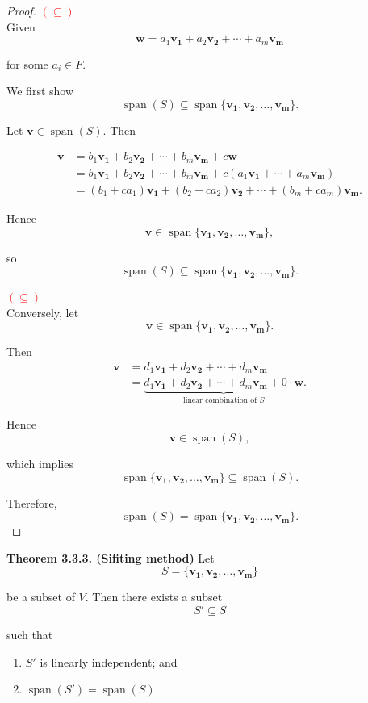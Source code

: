 \documentclass[12pt]{article}
\begin{document}
\begin{proof}
\textcolor{red}{$(\subseteq)$}\\
Given
\[
\mathbf{w}=a_1\mathbf{v_1}+a_2\mathbf{v_2}+\cdots+a_m\mathbf{v_m}
\]

for some $a_i\in F$.

We first show
\[
\operatorname{span}(S)\subseteq\operatorname{span}\{\mathbf{v_1,v_2,\ldots,v_m}\}.
\]

Let $\mathbf{v}\in\operatorname{span}(S)$. Then

\begin{align*}
\mathbf{v}
&=b_1\mathbf{v_1}+b_2\mathbf{v_2}+\cdots+b_m\mathbf{v_m}+c\mathbf{w}\\
&=b_1\mathbf{v_1}+b_2\mathbf{v_2}+\cdots+b_m\mathbf{v_m}
+c(a_1\mathbf{v_1}+\cdots+a_m\mathbf{v_m})\\
&=(b_1+ca_1)\mathbf{v_1}+(b_2+ca_2)\mathbf{v_2}+\cdots+(b_m+ca_m)\mathbf{v_m}.
\end{align*}

Hence
\[
\mathbf{v}\in\operatorname{span}\{\mathbf{v_1,v_2,\ldots,v_m}\},
\]

so
\[
\operatorname{span}(S)\subseteq\operatorname{span}\{\mathbf{v_1,v_2,\ldots,v_m}\}.
\]

\textcolor{red}{$(\subseteq)$}\\
Conversely, let
\[
\mathbf{v}\in\operatorname{span}\{\mathbf{v_1,v_2,\ldots,v_m}\}.
\]

Then
\begin{align*}
\mathbf{v}
&=d_1\mathbf{v_1}+d_2\mathbf{v_2}+\cdots+d_m\mathbf{v_m}\\
&=\underbrace{d_1\mathbf{v_1}+d_2\mathbf{v_2}+\cdots+d_m\mathbf{v_m}+0\cdot \mathbf{w}
}_{\text{linear combination of $S$}}.
\end{align*}

Hence
\[
\mathbf{v}\in\operatorname{span}(S),
\]

which implies
\[
\operatorname{span}\{\mathbf{v_1,v_2,\ldots,v_m}\}\subseteq\operatorname{span}(S).
\]

Therefore,
\[
\operatorname{span}(S)=\operatorname{span}\{\mathbf{v_1,v_2,\ldots,v_m}\}.
\]
\end{proof}

\textbf{Theorem 3.3.3. (Sifiting method)}
Let
\[
S=\{\mathbf{v_1,v_2,\ldots,v_m}\}
\]

be a subset of $V$. Then there exists a subset
\[
S'\subseteq S
\]

such that

\begin{enumerate}
    \item $S'$ is linearly independent; and
    \item $\operatorname{span}(S')=\operatorname{span}(S).$
\end{enumerate}
\end{document}
